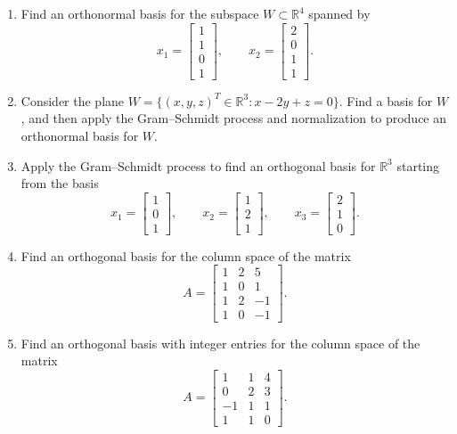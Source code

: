 \documentclass[11pt, letterpaper]{article}
\theoremstyle{definition}
\theoremstyle{remark}
\begin{document}
\begin{enumerate}[label=\textbf{Problem \arabic*.}, leftmargin=*, itemsep=0.9em]
    \item Find an orthonormal basis for the subspace $W \subset \mathbb{R}^4$ spanned by
    \[
        x_1 = \begin{bmatrix} 1 \\ 1 \\ 0 \\ 1 \end{bmatrix}, \qquad x_2 = \begin{bmatrix} 2 \\ 0 \\ 1 \\ 1 \end{bmatrix}.
    \]

    \item Consider the plane $W = \{(x, y, z)^T \in \mathbb{R}^3 : x - 2y + z = 0\}$. Find a basis for $W$, and then apply the Gram--Schmidt process and normalization to produce an orthonormal basis for $W$.

    \item Apply the Gram--Schmidt process to find an orthogonal basis for $\mathbb{R}^3$ starting from the basis
    \[
        x_1 = \begin{bmatrix} 1 \\ 0 \\ 1 \end{bmatrix}, \qquad x_2 = \begin{bmatrix} 1 \\ 2 \\ 1 \end{bmatrix}, \qquad x_3 = \begin{bmatrix} 2 \\ 1 \\ 0 \end{bmatrix}.
    \]

    \item Find an orthogonal basis for the column space of the matrix
    \[
        A = \begin{bmatrix}
            1 & 2 & 5 \\
            1 & 0 & 1 \\
            1 & 2 & -1 \\
            1 & 0 & -1
        \end{bmatrix}.
    \]

    \item Find an orthogonal basis with integer entries for the column space of the matrix
    \[
        A = \begin{bmatrix}
            1 & 1 & 4 \\
            0 & 2 & 3 \\
            -1 & 1 & 1 \\
            1 & 1 & 0
        \end{bmatrix}.
    \]


\end{enumerate}
\end{document}
